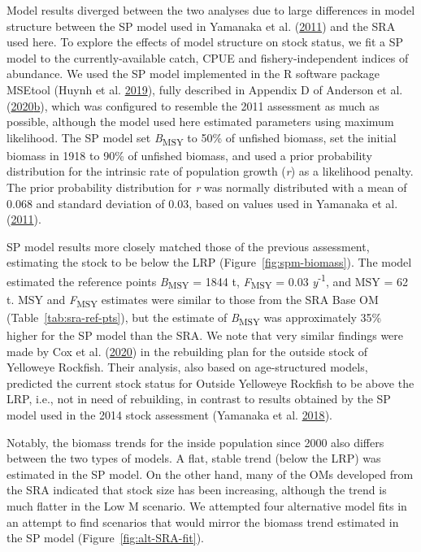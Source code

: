 \documentclass[11pt]{book}
\begin{document}
Model results diverged between the two analyses due to large differences in model structure between the SP model used in Yamanaka et al. (\protect\hyperlink{ref-yamanaka2011}{2011}) and the SRA used here. To explore the effects of model structure on stock status, we fit a SP model to the currently-available catch, CPUE and fishery-independent indices of abundance. We used the SP model implemented in the R software package MSEtool (Huynh et al. \protect\hyperlink{ref-huynh_msetool_2019}{2019}), fully described in Appendix D of Anderson et al. (\protect\hyperlink{ref-anderson2020gfmp}{2020}\protect\hyperlink{ref-anderson2020gfmp}{b}), which was configured to resemble the 2011 assessment as much as possible, although the model used here estimated parameters using maximum likelihood. The SP model set \emph{B}\textsubscript{MSY} to 50\% of unfished biomass, set the initial biomass in 1918 to 90\% of unfished biomass, and used a prior probability distribution for the intrinsic rate of population growth (\emph{r}) as a likelihood penalty. The prior probability distribution for \emph{r} was normally distributed with a mean of 0.068 and standard deviation of 0.03, based on values used in Yamanaka et al. (\protect\hyperlink{ref-yamanaka2011}{2011}).

SP model results more closely matched those of the previous assessment, estimating the stock to be below the LRP (Figure~\ref{fig:spm-biomass}). The model estimated the reference points \emph{B}\textsubscript{MSY} = 1844 t, \emph{F}\textsubscript{MSY} = 0.03 \emph{y}\textsuperscript{-1}, and MSY = 62 t. MSY and \emph{F}\textsubscript{MSY} estimates were similar to those from the SRA Base OM (Table~\ref{tab:sra-ref-pts}), but the estimate of \emph{B}\textsubscript{MSY} was approximately 35\% higher for the SP model than the SRA. We note that very similar findings were made by Cox et al. (\protect\hyperlink{ref-cox2020}{2020}) in the rebuilding plan for the outside stock of Yelloweye Rockfish. Their analysis, also based on age-structured models, predicted the current stock status for Outside Yelloweye Rockfish to be above the LRP, i.e., not in need of rebuilding, in contrast to results obtained by the SP model used in the 2014 stock assessment (Yamanaka et al. \protect\hyperlink{ref-yamanaka2018yelloweyeoutside}{2018}).

Notably, the biomass trends for the inside population since 2000 also differs between the two types of models. A flat, stable trend (below the LRP) was estimated in the SP model. On the other hand, many of the OMs developed from the SRA indicated that stock size has been increasing, although the trend is much flatter in the Low M scenario. We attempted four alternative model fits in an attempt to find scenarios that would mirror the biomass trend estimated in the SP model (Figure~\ref{fig:alt-SRA-fit}).
\end{document}
